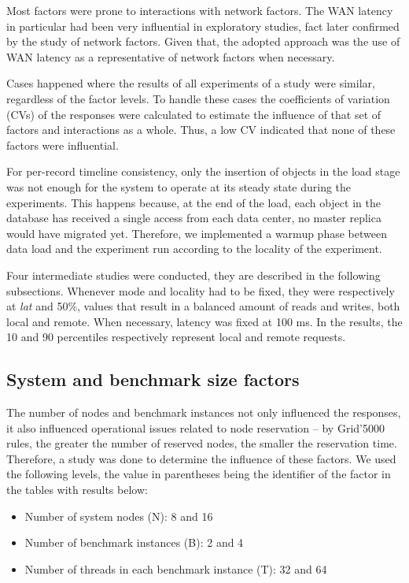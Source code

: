 \documentclass[doublespacing]{bmcart}
\begin{document}
Most factors were prone to interactions with network factors. The WAN latency in
particular had been very influential in exploratory studies, fact later confirmed by
the study of network factors. Given that, the adopted approach was the use of
WAN latency as a representative of network factors when necessary.

Cases happened where the results of all experiments of a study were
similar, regardless of the factor levels. To handle these cases the coefficients
of variation (CVs) of the responses were calculated to estimate the influence of
that set of factors and interactions as a whole. Thus, a low CV indicated that
none of these factors were influential.

For per-record timeline consistency, only the insertion of objects in the load stage was
not enough for the system to operate at its steady state during the experiments.
This happens because, at the end of the load, each object in the database has
received a single access from each data center, no master replica would have
migrated yet. Therefore, we implemented a warmup phase between data load and the experiment run according to the locality of the experiment.

Four intermediate studies were conducted, they are described in the following
subsections. Whenever mode and locality had to be fixed, they were respectively
at \textit{lat} and 50\%, values that result in a balanced amount of reads and
writes, both local and remote. When necessary, latency was fixed at 100 ms. In
the results, the 10 and 90 percentiles respectively represent local and remote
requests.

\subsection{System and benchmark size factors}

The number of nodes and benchmark instances not only influenced the
responses, it also influenced operational issues related to node reservation --
by Grid'5000 rules, the greater the number of reserved nodes, the smaller the
reservation time. Therefore, a study was done to determine the influence of
these factors. We used the following levels, the value in parentheses
being the identifier of the factor in the tables with results below:

\begin{itemize}

\item Number of system nodes (N): 8 and 16

\item Number of benchmark instances (B): 2 and 4

\item Number of threads in each benchmark instance (T): 32 and 64

\end{itemize}
\end{document}
